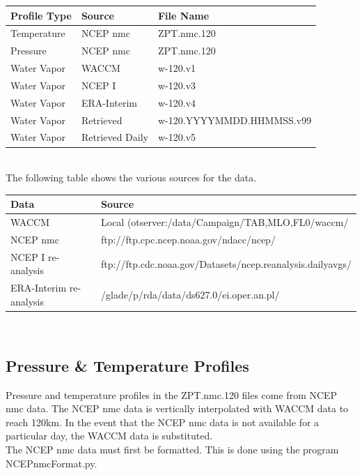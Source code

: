 \documentclass[12pt, letterpaper]{article}
\begin{document}
\begin{tabular}{ l l l }
\textbf{Profile Type} & \textbf{Source} & \textbf{File Name} \\
\hline
Temperature   & NCEP nmc          & ZPT.nmc.120 \\
Pressure      & NCEP nmc          & ZPT.nmc.120 \\
Water Vapor   & WACCM             & w-120.v1    \\
Water Vapor   & NCEP I            & w-120.v3    \\
Water Vapor   & ERA-Interim       & w-120.v4    \\
Water Vapor   & Retrieved         & w-120.YYYYMMDD.HHMMSS.v99    \\
Water Vapor   & Retrieved Daily   & w-120.v5    \\
\end{tabular} \\


The following table shows the various sources for the data.\\

\begin{tabular}{ l l }
\textbf{Data} & \textbf{Source} \\
\hline
WACCM              & Local (otserver:/data/Campaign/TAB,MLO,FL0/waccm/  \\
NCEP nmc           & ftp://ftp.cpc.ncep.noaa.gov/ndacc/ncep/\\
NCEP I re-analysis & ftp://ftp.cdc.noaa.gov/Datasets/ncep.reanalysis.dailyavgs/          \\
ERA-Interim re-analysis   & /glade/p/rda/data/ds627.0/ei.oper.an.pl/         \\
\end{tabular} \\


\subsection{Pressure \& Temperature Profiles}
\label{sec:PT}
Pressure and temperature profiles in the ZPT.nmc.120 files come from NCEP nmc data. The NCEP nmc data is vertically interpolated with WACCM data to reach 120km. In the event that the NCEP nmc data is not available for a particular day, the WACCM data is substituted.\\

The NCEP nmc data must first be formatted. This is done using the program NCEPnmcFormat.py.\\
\end{document}
